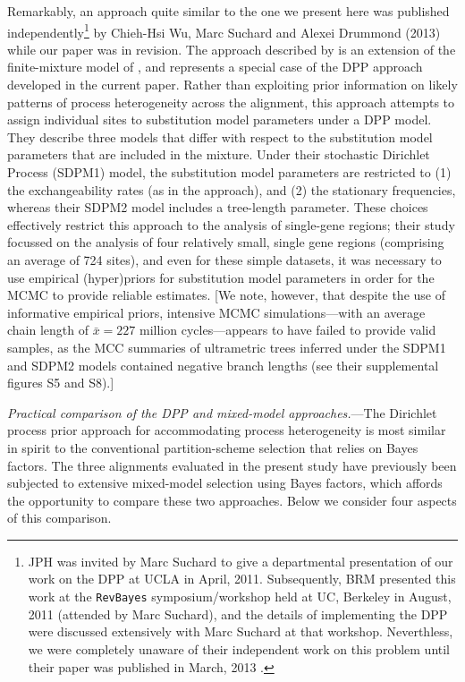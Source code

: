 \documentclass[11pt]{article}
\newcommand{\brmadd}[1]{{\color{blue}{#1}}}
\begin{document}
Remarkably, an approach quite similar to the one we present here was published independently\footnote{JPH was invited by Marc Suchard to give a departmental presentation of our work on the DPP at UCLA in April, 2011. Subsequently, BRM presented this work at the \texttt{RevBayes} symposium/workshop held at UC, Berkeley in August, 2011 (attended by Marc Suchard), and the details of implementing the DPP were discussed extensively with Marc Suchard at that workshop. Neverthless, we were completely unaware of their independent work on this problem until their paper was published in March, 2013  \citep[{\it c.f.},][]{rannala07,drummond06}.} by Chieh-Hsi Wu, Marc Suchard and Alexei Drummond (2013) while our paper was in revision.
The approach described by \citet[][]{wu2013} is an extension of the finite-mixture model of \citet[][]{pagel04}, and represents a special case of the DPP approach developed in the current paper.
Rather than exploiting prior information on likely patterns of process heterogeneity across the alignment, this approach attempts to assign individual sites to substitution model parameters under a DPP model.
They describe three models that differ with respect to the substitution model parameters that are included in the mixture.
Under their stochastic Dirichlet Process (SDPM1) model, the substitution model parameters are restricted to (1) the exchangeability rates (as in the \citet[][]{pagel04} approach), and (2) the stationary frequencies, whereas their SDPM2 model includes a tree-length parameter.
These choices effectively restrict this approach to the analysis of single-gene regions; their study focussed on the analysis of four relatively small, single gene regions (comprising an average of 724 sites), and even for these simple datasets, it was necessary to use empirical (hyper)priors for substitution model parameters in order for the MCMC to provide reliable estimates.
[We note, however, that despite the use of informative empirical priors, intensive MCMC simulations---with an average chain length of $\bar{x}=227$ million cycles---appears to have failed to provide valid samples, as the MCC summaries of ultrametric trees inferred under the SDPM1 and SDPM2 models contained negative branch lengths (see their supplemental figures S5 and S8).] 

\brmadd{Introduce Wu et al. method.  Describe it, and distinguish their approach from ours. JPH: Didn't you just do that?}


\bigskip
\noindent
 {\it Practical comparison of the DPP and mixed-model approaches.}---The Dirichlet process prior approach for accommodating process heterogeneity is most similar in spirit to the conventional partition-scheme selection that relies on Bayes factors.  
The three alignments evaluated in the present study have previously been subjected to extensive mixed-model selection using Bayes factors, which affords the opportunity to compare these two approaches.  
Below we consider four aspects of this comparison.
\end{document}
